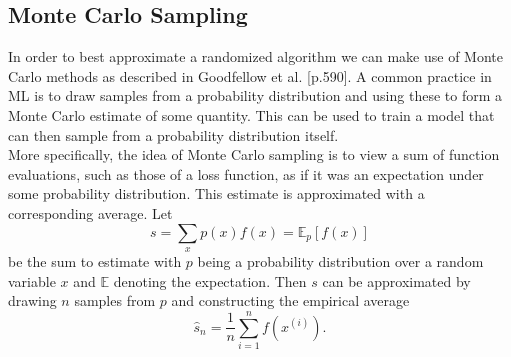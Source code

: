 \subsection{Monte Carlo Sampling}
In order to best approximate a randomized algorithm we can make use of Monte Carlo methods as described in Goodfellow et al. \cite{Goodfellow-et-al-2016}[p.590]. A common practice in ML is to draw samples from a probability distribution and using these to form a Monte Carlo estimate of some quantity. This can be used to train a model that can then sample from a probability distribution itself. \\
More specifically, the idea of Monte Carlo sampling is to view a sum of function evaluations, such as those of a loss function, as if it was an expectation under some probability distribution. This estimate is approximated with a corresponding average.
Let 
\begin{equation}
    s = \sum_x p(x)f(x)=\mathbb{E}_p[f(x)]
\end{equation}
be the sum to estimate with $p$ being a probability distribution over a random variable $x$ and $\mathbb{E}$ denoting the expectation. Then $s$ can be approximated by drawing $n$ samples from $p$ and constructing the empirical average 
\begin{equation}
    \hat{s}_n=\frac{1}{n}\sum_{i=1}^n f(x^{(i)}).
\end{equation}


